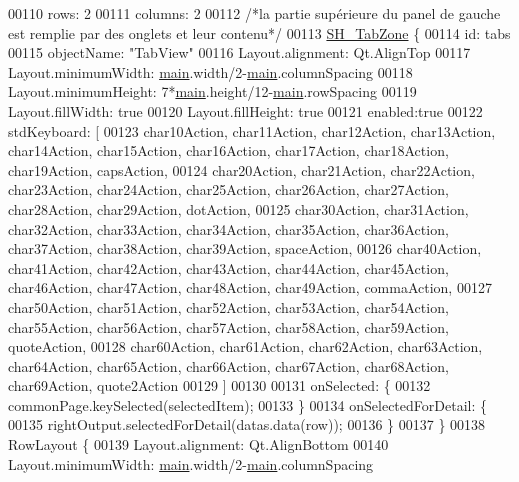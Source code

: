 \begin{DoxyCode}
00110         rows: 2
00111         columns: 2
00112         \textcolor{comment}{/*la partie supérieure du panel de gauche est remplie par des onglets et leur contenu*/}
00113         \hyperlink{classSH__TabZone}{SH\_TabZone} \{
00114             \textcolor{keywordtype}{id}: tabs
00115             objectName: \textcolor{stringliteral}{"TabView"}
00116             Layout.alignment: Qt.AlignTop
00117             Layout.minimumWidth: \hyperlink{main_8cpp_a3c04138a5bfe5d72780bb7e82a18e627}{main}.width/2-\hyperlink{main_8cpp_a3c04138a5bfe5d72780bb7e82a18e627}{main}.columnSpacing
00118             Layout.minimumHeight: 7*\hyperlink{main_8cpp_a3c04138a5bfe5d72780bb7e82a18e627}{main}.height/12-\hyperlink{main_8cpp_a3c04138a5bfe5d72780bb7e82a18e627}{main}.rowSpacing
00119             Layout.fillWidth: \textcolor{keyword}{true}
00120             Layout.fillHeight: \textcolor{keyword}{true}
00121             enabled:\textcolor{keyword}{true}
00122             stdKeyboard: [
00123                 char10Action, char11Action, char12Action, char13Action, char14Action, char15Action, 
      char16Action, char17Action, char18Action, char19Action, capsAction,
00124                 char20Action, char21Action, char22Action, char23Action, char24Action, char25Action, 
      char26Action, char27Action, char28Action, char29Action, dotAction,
00125                 char30Action, char31Action, char32Action, char33Action, char34Action, char35Action, 
      char36Action, char37Action, char38Action, char39Action, spaceAction,
00126                 char40Action, char41Action, char42Action, char43Action, char44Action, char45Action, 
      char46Action, char47Action, char48Action, char49Action, commaAction,
00127                 char50Action, char51Action, char52Action, char53Action, char54Action, char55Action, 
      char56Action, char57Action, char58Action, char59Action, quoteAction,
00128                 char60Action, char61Action, char62Action, char63Action, char64Action, char65Action, 
      char66Action, char67Action, char68Action, char69Action, quote2Action
00129             ]
00130 
00131             onSelected: \{
00132                 commonPage.keySelected(selectedItem);
00133             \}
00134             onSelectedForDetail: \{
00135                 rightOutput.selectedForDetail(datas.data(row));
00136             \}
00137         \}
00138         RowLayout \{
00139             Layout.alignment: Qt.AlignBottom
00140             Layout.minimumWidth: \hyperlink{main_8cpp_a3c04138a5bfe5d72780bb7e82a18e627}{main}.width/2-\hyperlink{main_8cpp_a3c04138a5bfe5d72780bb7e82a18e627}{main}.columnSpacing

\end{DoxyCode}
